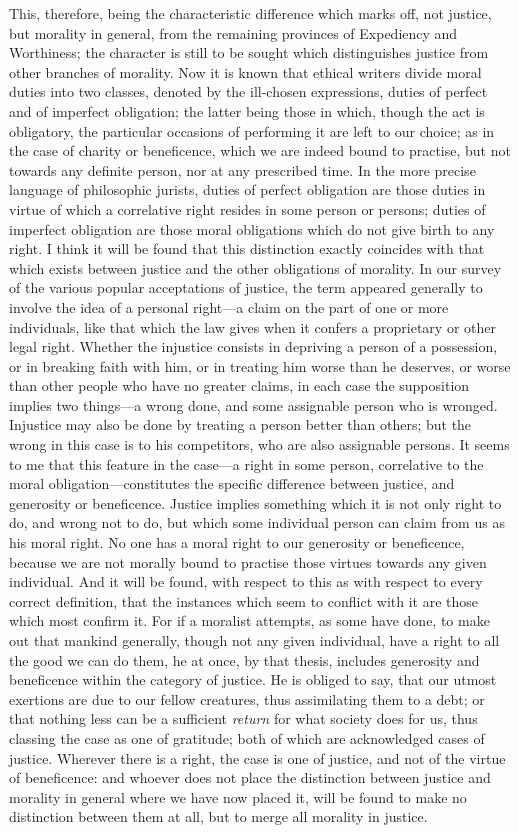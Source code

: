 \documentclass[12pt]{report}
\begin{document}
This, therefore, being the characteristic difference which marks off, not justice, but morality in general, from the remaining provinces of Expediency and Worthiness; the character is still to be sought which distinguishes justice from other branches of morality. Now it is known that ethical writers divide moral duties into two classes, denoted by the ill-chosen expressions, duties of perfect and of imperfect obligation; the latter being those in which, though the act is obligatory, the particular occasions of performing it are left to our choice; as in the case of charity or beneficence, which we are indeed bound to practise, but not towards any definite person, nor at any prescribed time. In the more precise language of philosophic jurists, duties of perfect obligation are those duties in virtue of which a correlative right resides in some person or persons; duties of imperfect obligation are those moral obligations which do not give birth to any right. I think it will be found that this distinction exactly coincides with that which exists between justice and the other obligations of morality. In our survey of the various popular acceptations of justice, the term appeared generally to involve the idea of a personal right—a claim on the part of one or more individuals, like that which the law gives when it confers a proprietary or other legal right. Whether the injustice consists in depriving a person of a possession, or in breaking faith with him, or in treating him worse than he deserves, or worse than other people who have no greater claims, in each case the supposition implies two things—a wrong done, and some assignable person who is wronged. Injustice may also be done by treating a person better than others; but the wrong in this case is to his competitors, who are also assignable persons. It seems to me that this feature in the case—a right in some person, correlative to the moral obligation—constitutes the specific difference between justice, and generosity or beneficence. Justice implies something which it is not only right to do, and wrong not to do, but which some individual person can claim from us as his moral right. No one has a moral right to our generosity or beneficence, because we are not morally bound to practise those virtues towards any given individual. And it will be found, with respect to this as with respect to every correct definition, that the instances which seem to conflict with it are those which most confirm it. For if a moralist attempts, as some have done, to make out that mankind generally, though not any given individual, have a right to all the good we can do them, he at once, by that thesis, includes generosity and beneficence within the category of justice. He is obliged to say, that our utmost exertions are due to our fellow creatures, thus assimilating them to a debt; or that nothing less can be a sufficient \emph{return} for what society does for us, thus classing the case as one of gratitude; both of which are acknowledged cases of justice. Wherever there is a right, the case is one of justice, and not of the virtue of beneficence: and whoever does not place the distinction between justice and morality in general where we have now placed it, will be found to make no distinction between them at all, but to merge all morality in justice.
\end{document}
